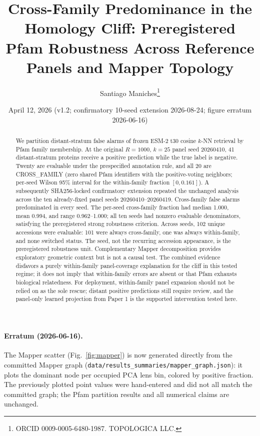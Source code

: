 \documentclass[11pt]{article}
\title{Cross-Family Predominance in the Homology Cliff: Preregistered Pfam Robustness Across Reference Panels and Mapper Topology}
\author{Santiago Maniches\thanks{ORCID 0009-0005-6480-1987. TOPOLOGICA LLC.}}
\date{April 12, 2026 (v1.2; confirmatory 10-seed extension 2026-08-24; figure erratum 2026-06-16)}
\begin{document}
\maketitle
\begin{abstract}
We partition distant-stratum false alarms of frozen ESM-2 t30 cosine $k$-NN retrieval by Pfam family membership. At the original $R{=}1000$, $k{=}25$ panel seed 20260410, 41 distant-stratum proteins receive a positive prediction while the true label is negative. Twenty are evaluable under the prespecified annotation rule, and all 20 are CROSS\_FAMILY (zero shared Pfam identifiers with the positive-voting neighbors; per-seed Wilson 95\% interval for the within-family fraction $[0,0.161]$). A subsequently SHA256-locked confirmatory extension repeated the unchanged analysis across the ten already-fixed panel seeds 20260410--20260419. Cross-family false alarms predominated in every seed. The per-seed cross-family fraction had median 1.000, mean 0.994, and range 0.962--1.000; all ten seeds had nonzero evaluable denominators, satisfying the preregistered strong robustness criterion. Across seeds, 102 unique accessions were evaluable: 101 were always cross-family, one was always within-family, and none switched status. The seed, not the recurring accession appearance, is the preregistered robustness unit. Complementary Mapper decomposition provides exploratory geometric context but is not a causal test. The combined evidence disfavors a purely within-family panel-coverage explanation for the cliff in this tested regime; it does not imply that within-family errors are absent or that Pfam exhausts biological relatedness. For deployment, within-family panel expansion should not be relied on as the sole rescue; distant positive predictions still require review, and the panel-only learned projection from Paper 1 is the supported intervention tested here.
\end{abstract}

\paragraph{Erratum (2026-06-16).} The Mapper scatter (Fig.~\ref{fig:mapper}) is now generated directly from the committed Mapper graph (\texttt{data/results\_summaries/mapper\_graph.json}): it plots the dominant node per occupied PCA lens bin, colored by positive fraction. The previously plotted point values were hand-entered and did not all match the committed graph; the Pfam partition results and all numerical claims are unchanged.
\end{document}

